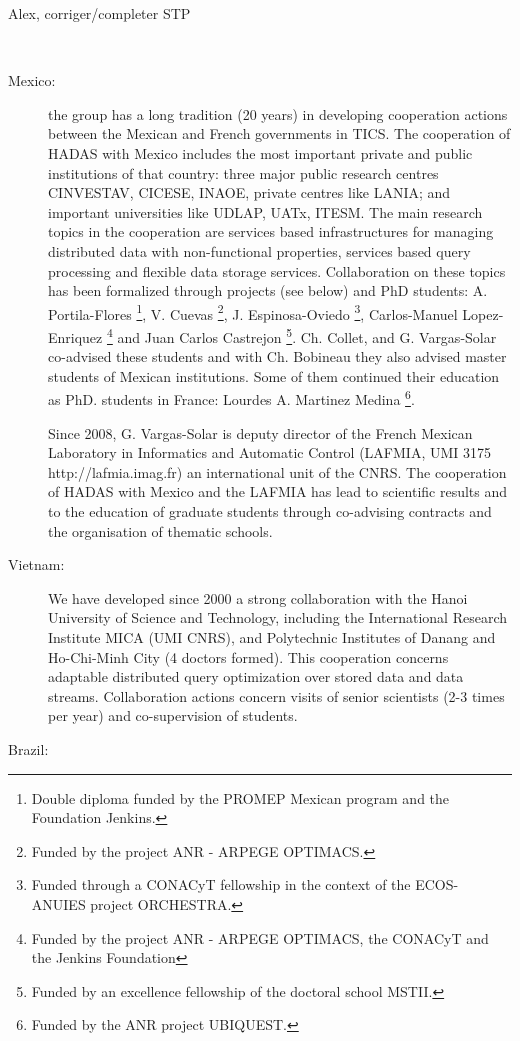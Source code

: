 Alex, corriger/completer STP

\ \\

\begin{description}
\item[Mexico:] the group has a long tradition (20 years) in developing cooperation actions between the Mexican and French governments in TICS. 
The cooperation of HADAS with Mexico includes the most important private and public institutions of that country: three major public research centres CINVESTAV, CICESE, INAOE, private centres like LANIA; and important universities like UDLAP, UATx, ITESM. 
The main research topics in the cooperation are services based infrastructures for managing distributed data with non-functional properties, services based query processing and flexible data storage services.  Collaboration on these topics has been formalized through projects (see below) and PhD students: A. Portila-Flores \footnote{Double diploma funded by the PROMEP Mexican program and the Foundation Jenkins.}, V. Cuevas \footnote{Funded by the project ANR - ARPEGE OPTIMACS.}, J. Espinosa-Oviedo \footnote{Funded through a CONACyT fellowship in the context of the ECOS-ANUIES project ORCHESTRA.}, Carlos-Manuel Lopez-Enriquez \footnote{Funded by the project ANR - ARPEGE OPTIMACS, the CONACyT and the Jenkins Foundation} and Juan Carlos Castrejon \footnote{Funded by an excellence fellowship of the doctoral school MSTII.}.  Ch. Collet, and G. Vargas-Solar co-advised these students and with Ch. Bobineau they also advised master students of Mexican institutions. Some of them continued their education as PhD. students in France: Lourdes A. Martinez Medina \footnote{Funded by the ANR project UBIQUEST.}. 


Since 2008, G. Vargas-Solar is deputy director of the French Mexican Laboratory in Informatics and Automatic Control (LAFMIA, UMI 3175 http://lafmia.imag.fr) an international unit of the CNRS. 
The cooperation of HADAS with Mexico and the LAFMIA has lead to scientific results and to the education of graduate students through co-advising contracts and the organisation of thematic schools. 





\item[Vietnam:] We have developed since 2000 a strong collaboration with the Hanoi University of Science and Technology, including the International Research Institute MICA (UMI CNRS), and Polytechnic Institutes of Danang and Ho-Chi-Minh City (4 doctors formed). This cooperation concerns adaptable distributed query optimization over stored data and data streams. Collaboration actions concern visits of senior scientists (2-3 times per year) and co-supervision of students.
\ \\
\item[Brazil:] 


\end{description}
